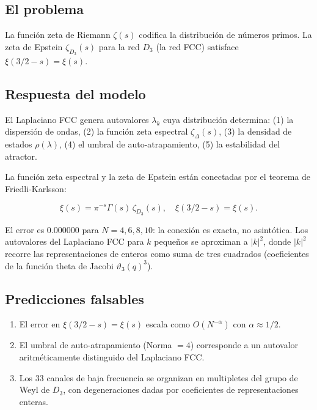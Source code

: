 \documentclass[twocolumn]{article}
\begin{document}
\subsection{El problema}

La funci\'on zeta de Riemann $\zeta(s)$ codifica la distribuci\'on
de n\'umeros primos. La zeta de Epstein $\zeta_{D_3}(s)$ para la
red $D_3$ (la red FCC) satisface $\xi(3/2-s)=\xi(s)$.

\subsection{Respuesta del modelo}

El Laplaciano FCC genera autovalores $\lambda_k$ cuya distribuci\'on
determina: (1) la dispersi\'on de ondas, (2) la funci\'on zeta
espectral $\zeta_\Delta(s)$, (3) la densidad de estados
$\rho(\lambda)$, (4) el umbral de auto-atrapamiento, (5) la
estabilidad del atractor.

La funci\'on zeta espectral y la zeta de Epstein est\'an conectadas
por el teorema de Friedli-Karlsson:

\begin{equation}
  \xi(s) = \pi^{-s}\Gamma(s)\,\zeta_{D_3}(s),\quad
  \xi(3/2-s)=\xi(s).
\end{equation}

El error es $0.000000$ para $N=4,6,8,10$: la conexi\'on es exacta,
no asint\'otica. Los autovalores del Laplaciano FCC para $k$
peque\~nos se aproximan a $|k|^2$, donde $|k|^2$ recorre las
representaciones de enteros como suma de tres cuadrados (coeficientes
de la funci\'on theta de Jacobi $\vartheta_3(q)^3$).

\subsection{Predicciones falsables}

\begin{enumerate}
  \item[C1.] El error en $\xi(3/2-s)=\xi(s)$ escala como
    $O(N^{-\alpha})$ con $\alpha \approx 1/2$.
  \item[C2.] El umbral de auto-atrapamiento (Norma $=4$) corresponde
    a un autovalor aritm\'eticamente distinguido del Laplaciano FCC.
  \item[C3.] Los 33 canales de baja frecuencia se organizan en
    multipletes del grupo de Weyl de $D_3$, con degeneraciones dadas
    por coeficientes de representaciones enteras.
\end{enumerate}
\end{document}
